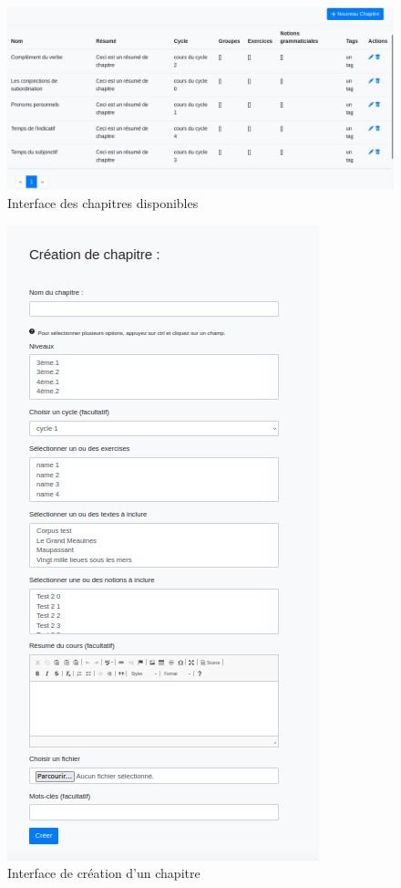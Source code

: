 \documentclass[12pt]{article}
\begin{document}
\begin{figure}
    \centering
    \includegraphics[scale=0.28]{table_chap.png}
    \caption{Interface des chapitres disponibles}
    \label{fig:table_chap}
\end{figure}


\begin{figure}
    \centering
    \includegraphics[scale=0.9]{crea_chap.png}
    \caption{Interface de création d'un chapitre}
    \label{fig:crea_chap}
\end{figure}
\end{document}
